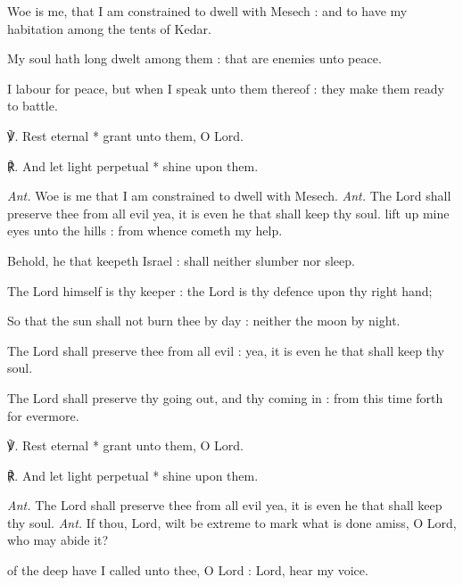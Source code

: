 Woe is me, that I am constrained to dwell with Mesech : and to have my habitation among the tents of Kedar.\par
{}My soul hath long dwelt among them : that are enemies unto peace.\par
{}I labour for peace, but when I speak unto them thereof : they make them ready to battle.\par
℣. Rest eternal * grant unto them, O Lord.\par
℟. And let light perpetual * shine upon them.\par\noindent
\textit{Ant.} Woe is me that I am constrained to dwell with Mesech.
\noindent
\textit{Ant.} The Lord {\dag} shall preserve thee from all evil yea, it is even he that shall keep thy soul.
 lift up mine eyes unto the hills : from whence cometh my help.\par
{}
Behold, he that keepeth Israel : shall neither slumber nor sleep.\par
{}The Lord himself is thy keeper : the Lord is thy defence upon thy right hand;\par
{}So that the sun shall not burn thee by day : neither the moon by night.\par
{}The Lord shall preserve thee from all evil : yea, it is even he that shall keep thy soul.\par
{}The Lord shall preserve thy going out, and thy coming in : from this time forth for evermore.
\par
℣. Rest eternal * grant unto them, O Lord.\par
℟. And let light perpetual * shine upon them.\par\noindent
\textit{Ant.} The Lord shall preserve thee from all evil yea, it is even he that shall keep thy soul.
\noindent
\textit{Ant.} If thou, Lord, wilt be extreme {\dag} to mark what is done amiss, O Lord, who may abide it?\par
{} of the deep have I called unto thee, O Lord : Lord, hear my voice.\par
{}
